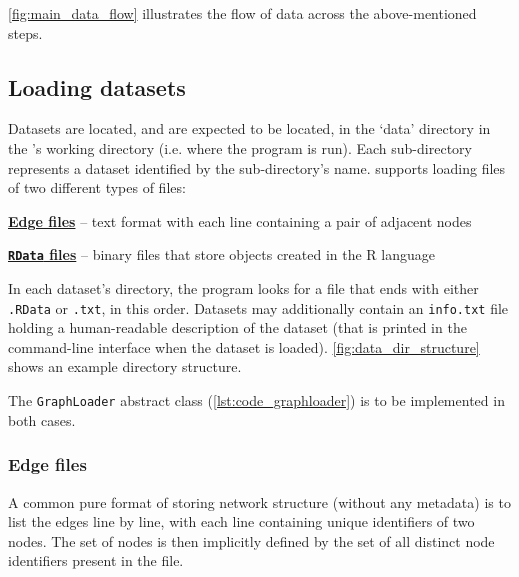 \autoref{fig:main_data_flow} illustrates the flow of data across the above-mentioned steps.

\subsection{Loading datasets}

Datasets are located, and are expected to be located, in the `data' directory in the \graffs's working directory (i.e. where the program is run).
Each sub-directory represents a dataset identified by the sub-directory's name.
\graffs supports loading files of two different types of files:

\begin{description}[itemsep=\zerospace]
    \item \hyperref[sec:edge_files]{\textbf{Edge files}} -- text format with each line containing a pair of adjacent nodes
    \item \hyperref[sec:rdata_files]{\textbf{\texttt{RData} files}} -- binary files that store objects created in the R language~\cite{RCoreTeamLanguageEnvironmentStatistical2009}
\end{description}



In each dataset's directory, the program looks for a file that ends with either \texttt{.RData} or \texttt{.txt}, in this order.
Datasets may additionally contain an \texttt{info.txt} file holding a human-readable description of the dataset (that is printed in the command-line interface when the dataset is loaded).
\autoref{fig:data_dir_structure} shows an example directory structure.

The \texttt{GraphLoader} abstract class (\autoref{lst:code_graphloader}) is to be implemented in both cases.


\subsubsection{Edge files}\label{sec:edge_files}

A common pure format of storing network structure (without any metadata) is to list the edges line by line, with each line containing unique identifiers of two nodes.
The set of nodes is then implicitly defined by the set of all distinct node identifiers present in the file.

